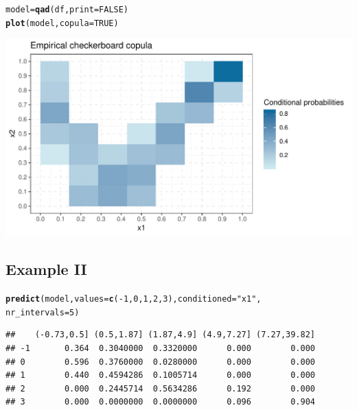 \documentclass{scrartcl}\usepackage[]{graphicx}\usepackage[]{color}
\makeatletter
\def\maxwidth{ %
  \ifdim\Gin@nat@width>\linewidth
    \linewidth
  \else
    \Gin@nat@width
  \fi
}
\newcommand{\hlnum}[1]{\textcolor[rgb]{0.686,0.059,0.569}{#1}}%
\newcommand{\hlstr}[1]{\textcolor[rgb]{0.192,0.494,0.8}{#1}}%
\newcommand{\hlopt}[1]{\textcolor[rgb]{0,0,0}{#1}}%
\newcommand{\hlstd}[1]{\textcolor[rgb]{0.345,0.345,0.345}{#1}}%
\newcommand{\hlkwb}[1]{\textcolor[rgb]{0.69,0.353,0.396}{#1}}%
\newcommand{\hlkwc}[1]{\textcolor[rgb]{0.333,0.667,0.333}{#1}}%
\newcommand{\hlkwd}[1]{\textcolor[rgb]{0.737,0.353,0.396}{\textbf{#1}}}%
\newenvironment{kframe}{%
 \def\at@end@of@kframe{}%
 \ifinner\ifhmode%
  \def\at@end@of@kframe{\end{minipage}}%
  \begin{minipage}{\columnwidth}%
 \fi\fi%
 \def\FrameCommand##1{\hskip\@totalleftmargin \hskip-\fboxsep
 \colorbox{shadecolor}{##1}\hskip-\fboxsep
     \hskip-\linewidth \hskip-\@totalleftmargin \hskip\columnwidth}%
 \MakeFramed {\advance\hsize-\width
   \@totalleftmargin\z@ \linewidth\hsize
   \@setminipage}}%
 {\par\unskip\endMakeFramed%
 \at@end@of@kframe}
\newenvironment{knitrout}{}{} %
\makeatother
\begin{document}
\begin{knitrout}
\color{fgcolor}\begin{kframe}
\begin{alltt}
\hlstd{model} \hlkwb{=} \hlkwd{qad}\hlstd{(df,}\hlkwc{print}\hlstd{=}\hlnum{FALSE}\hlstd{)}
\hlkwd{plot}\hlstd{(model,} \hlkwc{copula} \hlstd{=} \hlnum{TRUE}\hlstd{)}
\end{alltt}
\end{kframe}
\includegraphics[width=\maxwidth]{figure/unnamed-chunk-6-1} 

\end{knitrout}


\subsection{Example II}
\begin{knitrout}
\color{fgcolor}\begin{kframe}
\begin{alltt}
\hlkwd{predict}\hlstd{(model,} \hlkwc{values} \hlstd{=} \hlkwd{c}\hlstd{(}\hlopt{-}\hlnum{1}\hlstd{,}\hlnum{0}\hlstd{,}\hlnum{1}\hlstd{,}\hlnum{2}\hlstd{,}\hlnum{3}\hlstd{),} \hlkwc{conditioned} \hlstd{=} \hlstr{"x1"}\hlstd{,}
        \hlkwc{nr_intervals} \hlstd{=} \hlnum{5}\hlstd{)}
\end{alltt}
\begin{verbatim}
##    (-0.73,0.5] (0.5,1.87] (1.87,4.9] (4.9,7.27] (7.27,39.82]
## -1       0.364  0.3040000  0.3320000      0.000        0.000
## 0        0.596  0.3760000  0.0280000      0.000        0.000
## 1        0.440  0.4594286  0.1005714      0.000        0.000
## 2        0.000  0.2445714  0.5634286      0.192        0.000
## 3        0.000  0.0000000  0.0000000      0.096        0.904
\end{verbatim}
\end{kframe}
\end{knitrout}
\end{document}
